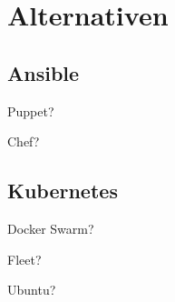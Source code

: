\chapter{Alternativen}\label{ch:alternativen}
\section{Ansible}\label{sec:ansible-alternativen}
Puppet?

Chef?
\section{Kubernetes}\label{sec:kubernetes-alternativen}
Docker Swarm?

Fleet?

Ubuntu?